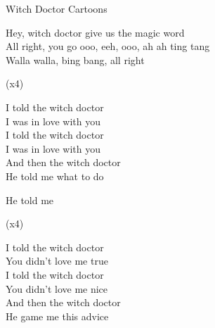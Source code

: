 \begin{song}{Witch Doctor}
  {} %
  {\SBOrgMel} %
  {Cartoons} %
  {} %
  {\NotCCLIed} %

\begin{SBSection*}
  Hey, witch doctor give us the magic word \\
  All right, you go ooo, eeh, ooo, ah ah ting tang \\
  Walla walla, bing bang, all right \\
\end{SBSection*}

\begin{SBChorus}
   (x4)
\end{SBChorus}

\begin{SBVerse}
  I told the witch doctor \\
  I was in love with you \\
  I told the witch doctor \\
  I was in love with you \\
  And then the witch doctor \\
  He told me what to do \\
\end{SBVerse}

\begin{SBSection*}
  He told me
\end{SBSection*}

\begin{SBChorus}
   (x4)
\end{SBChorus}

\begin{SBVerse}
  I told the witch doctor \\
  You didn't love me true \\
  I told the witch doctor \\
  You didn't love me nice \\
  And then the witch doctor \\
  He game me this advice \\
\end{SBVerse}


\end{song}
